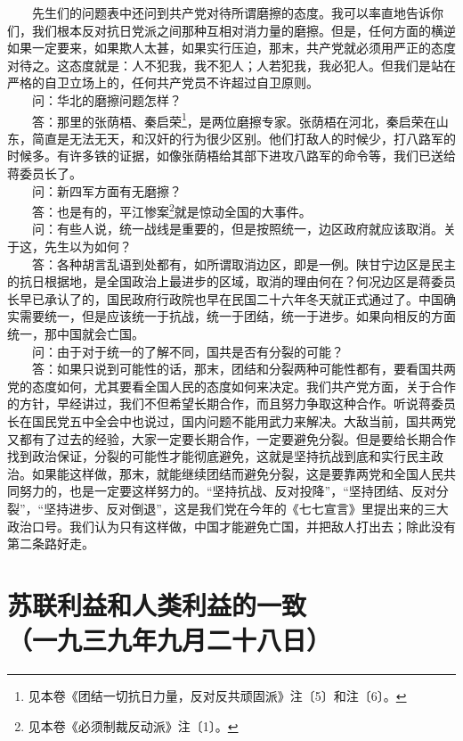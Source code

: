 \documentclass[cn,11pt,chinese]{elegantbook}
\def\myformat#1{\hfil\hfil #1}
\begin{document}
　　先生们的问题表中还问到共产党对待所谓磨擦的态度。我可以率直地告诉你们，我们根本反对抗日党派之间那种互相对消力量的磨擦。但是，任何方面的横逆如果一定要来，如果欺人太甚，如果实行压迫，那末，共产党就必须用严正的态度对待之。这态度就是：人不犯我，我不犯人；人若犯我，我必犯人。但我们是站在严格的自卫立场上的，任何共产党员不许超过自卫原则。\\
　　问：华北的磨擦问题怎样？\\
　　答：那里的张荫梧、秦启荣\footnote[8]{ 见本卷《团结一切抗日力量，反对反共顽固派》注〔5〕和注〔6〕。
}，是两位磨擦专家。张荫梧在河北，秦启荣在山东，简直是无法无天，和汉奸的行为很少区别。他们打敌人的时候少，打八路军的时候多。有许多铁的证据，如像张荫梧给其部下进攻八路军的命令等，我们已送给蒋委员长了。\\
　　问：新四军方面有无磨擦？\\
　　答：也是有的，平江惨案\footnote[9]{ 见本卷《必须制裁反动派》注〔1〕。}就是惊动全国的大事件。\\
　　问：有些人说，统一战线是重要的，但是按照统一，边区政府就应该取消。关于这，先生以为如何？\\
　　答：各种胡言乱语到处都有，如所谓取消边区，即是一例。陕甘宁边区是民主的抗日根据地，是全国政治上最进步的区域，取消的理由何在？何况边区是蒋委员长早已承认了的，国民政府行政院也早在民国二十六年冬天就正式通过了。中国确实需要统一，但是应该统一于抗战，统一于团结，统一于进步。如果向相反的方面统一，那中国就会亡国。\\
　　问：由于对于统一的了解不同，国共是否有分裂的可能？\\
　　答：如果只说到可能性的话，那末，团结和分裂两种可能性都有，要看国共两党的态度如何，尤其要看全国人民的态度如何来决定。我们共产党方面，关于合作的方针，早经讲过，我们不但希望长期合作，而且努力争取这种合作。听说蒋委员长在国民党五中全会中也说过，国内问题不能用武力来解决。大敌当前，国共两党又都有了过去的经验，大家一定要长期合作，一定要避免分裂。但是要给长期合作找到政治保证，分裂的可能性才能彻底避免，这就是坚持抗战到底和实行民主政治。如果能这样做，那末，就能继续团结而避免分裂，这是要靠两党和全国人民共同努力的，也是一定要这样努力的。“坚持抗战、反对投降”，“坚持团结、反对分裂”，“坚持进步、反对倒退”，这是我们党在今年的《七七宣言》里提出来的三大政治口号。我们认为只有这样做，中国才能避免亡国，并把敌人打出去；除此没有第二条路好走。\\
\newpage\section*{\myformat{苏联利益和人类利益的一致}\\\myformat{（一九三九年九月二十八日）}}
\end{document}
